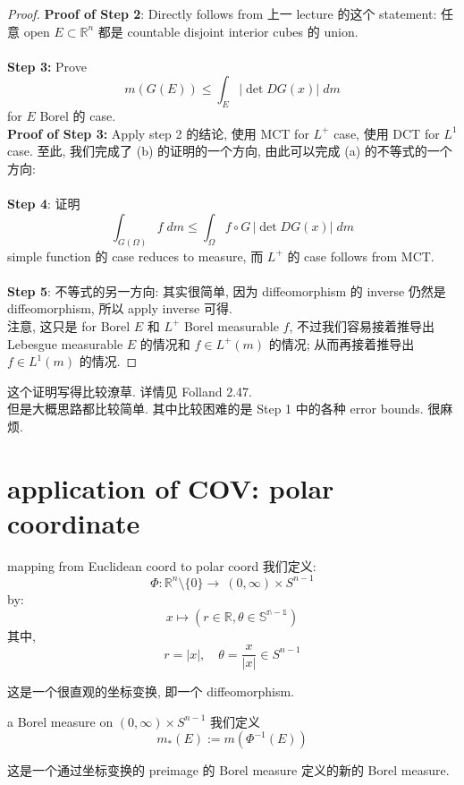 \documentclass[lang=cn,11pt]{elegantbook}
\begin{document}
\begin{proof}
\textbf{Proof of Step 2}: Directly follows from 上一 lecture 的这个 statement: 任意 open $E \subset\mathbb{R}^n$ 都是 countable disjoint interior cubes 的 union.\\\\
\textbf{Step 3:} Prove \[m(G(E)) \leq \int_E |\det DG(x)| \; dm\] for $E$ Borel 的 case.\\
\textbf{Proof of Step 3:} Apply step 2 的结论, 使用 MCT for $L^+$ case, 使用 DCT for $L^1$ case.
至此, 我们完成了 (b) 的证明的一个方向, 由此可以完成 (a) 的不等式的一个方向:\\\\
\textbf{Step 4}: 证明 \[
\int _{G(\Omega)} f\; dm \leq \int_{\Omega  }f\circ G \,|\det DG(x)| \; dm
\]
simple function 的 case reduces to measure, 而 $L^+$ 的 case follows from MCT.\\\\
\textbf{Step 5}: 不等式的另一方向: 其实很简单, 因为 diffeomorphism 的 inverse 仍然是 diffeomorphism, 所以 apply inverse 可得.\\
注意, 这只是 for Borel $E$ 和 $L^+$ Borel measurable $f$, 不过我们容易接着推导出 Lebesgue measurable $E$ 的情况和 $f \in L^+(m)$ 的情况; 从而再接着推导出  $f\in L^1(m)$ 的情况.
\end{proof}
\begin{remark}
这个证明写得比较潦草. 详情见 Folland 2.47.\\
但是大概思路都比较简单. 其中比较困难的是 Step 1 中的各种 error bounds. 很麻烦.\\
\end{remark}


\section{application of COV: polar coordinate}
\begin{definition}{mapping from Euclidean coord to polar coord}
 我们定义: \[
\Phi: \mathbb{R}^n \setminus \{0\}  \rightarrow \ (0,\infty) \times S^{n-1}
\]by: \[
x \mapsto (r\in \mathbb{R},\theta \in\mathbb{S^{n-1}})
\]
其中, \[
r = |x| ,\quad \theta =  \frac{x}{|x|} \in S^{n-1}
\]
   
\end{definition}
这是一个很直观的坐标变换, 即一个 diffeomorphism.\\

\begin{definition}{a Borel measure on $(0,\infty) \times S^{n-1}$}
    我们定义 \[
    m_*(E) := m(\Phi^{-1}(E))
    \]
\end{definition}
这是一个通过坐标变换的 preimage 的 Borel measure 定义的新的 Borel measure.\\
\end{document}
